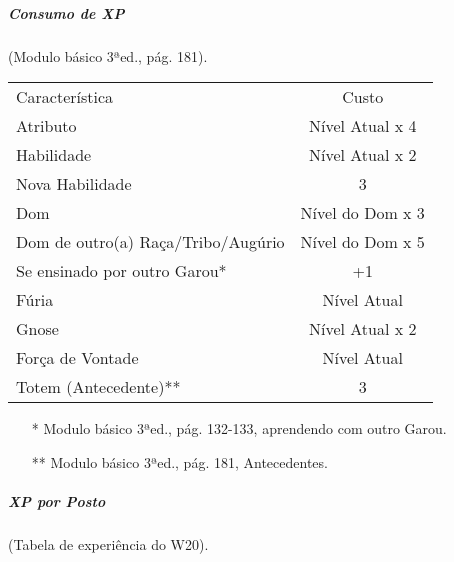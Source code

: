 \subparagraph{\bf Consumo de XP}(Modulo básico 3ªed., pág. 181).

\begin{table}[!htpb]
\centering
\label{consumo_XP}
\begin{tabular}{|l c|}
\hline
Característica						&	Custo				\\

\rowcolor[HTML]{EFEFEF} 
Atributo							& Nível Atual x 4 		\\

Habilidade							& Nível Atual x 2		\\

\rowcolor[HTML]{EFEFEF} 
Nova Habilidade 					& 3						\\

Dom									& Nível do Dom x 3		\\

\rowcolor[HTML]{EFEFEF} 
Dom de outro(a) Raça/Tribo/Augúrio	& Nível do Dom x 5		\\

Se ensinado por outro Garou*		& +1					\\

\rowcolor[HTML]{EFEFEF} 
Fúria								& Nível Atual			\\

Gnose								& Nível Atual x 2		\\

\rowcolor[HTML]{EFEFEF} 
Força de Vontade					& Nível Atual			\\

Totem (Antecedente)**				& 3						\\
\hline
\end{tabular}
\end{table}

\begin{itemize}[noitemsep]
\item[*] Modulo básico 3ªed., pág. 132-133, aprendendo com outro Garou.
\item[**] Modulo básico 3ªed., pág. 181, Antecedentes.
\end{itemize}


\subparagraph{\bf XP por Posto}(Tabela de experiência do W20).

